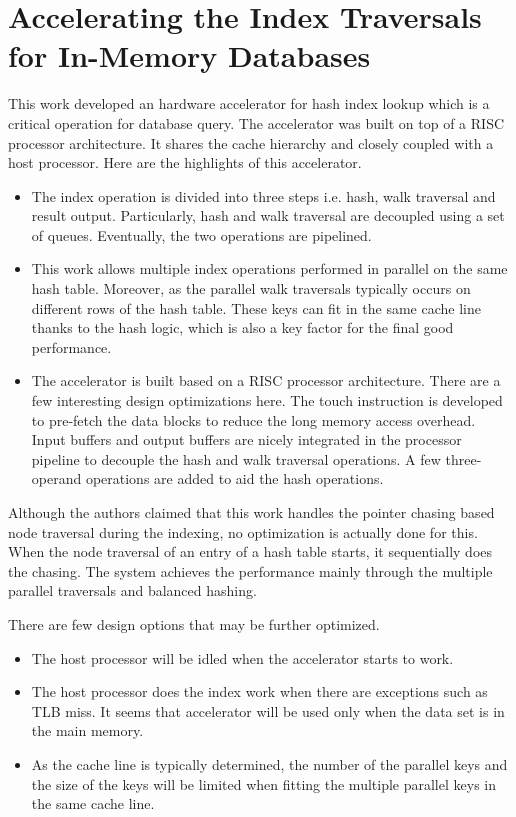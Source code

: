 \section{Accelerating the Index Traversals for In-Memory Databases}
This work \cite{kocberber2013meet} developed an hardware accelerator for hash index lookup which is a
critical operation for database query. The accelerator was built on top of a RISC
processor architecture. It shares the cache hierarchy and closely coupled with a
host processor. Here are the highlights of this accelerator.

\begin{itemize}
    \item The index operation is divided into three steps i.e. hash, walk
        traversal and result output. Particularly, hash and walk traversal are
        decoupled using a set of queues. Eventually, the two operations are
        pipelined. 
    \item This work allows multiple index operations performed in parallel on
        the same hash table. Moreover, as the parallel walk traversals typically
        occurs on different rows of the hash table. These keys can fit in the
        same cache line thanks to the hash logic, which is also a key factor for
        the final good performance.
    \item The accelerator is built based on a RISC processor architecture. There
        are a few interesting design optimizations here.
        \subitem The touch instruction is developed to pre-fetch the data blocks
        to reduce the long memory access overhead.
        \subitem Input buffers and output buffers are nicely integrated in the
        processor pipeline to decouple the hash and walk traversal operations.
        \subitem A few three-operand operations are added to aid the hash
        operations.
\end{itemize}

Although the authors claimed that this work handles the pointer chasing based
node traversal during the indexing, no optimization is actually done for this.
When the node traversal of an entry of a hash table starts, it sequentially does
the chasing. The system achieves the performance mainly through the multiple
parallel traversals and balanced hashing.

There are few design options that may be further optimized.
\begin{itemize}
    \item The host processor will be idled when the accelerator starts to work.
    \item The host processor does the index work when there are exceptions such
        as TLB miss. It seems that accelerator will be used only when the data
        set is in the main memory.
    \item As the cache line is typically determined, the number of the parallel keys and
        the size of the keys will be limited when fitting the multiple parallel
        keys in the same cache line.
\end{itemize}

